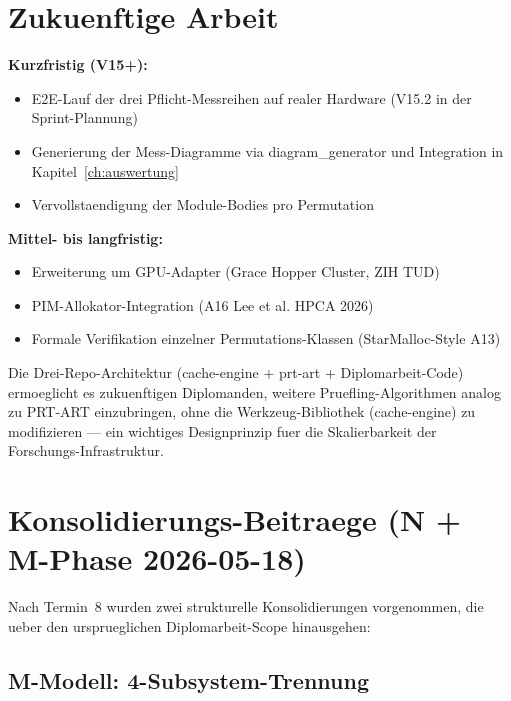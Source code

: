 \section{Zukuenftige Arbeit}\label{sec:ausblick}

\textbf{Kurzfristig (V15+):}

\begin{itemize}
    \item E2E-Lauf der drei Pflicht-Messreihen auf realer Hardware
          (V15.2 in der Sprint-Plannung)
    \item Generierung der Mess-Diagramme via diagram\_generator und
          Integration in Kapitel~\ref{ch:auswertung}
    \item Vervollstaendigung der Module-Bodies pro Permutation
\end{itemize}

\textbf{Mittel- bis langfristig:}

\begin{itemize}
    \item Erweiterung um GPU-Adapter (Grace Hopper Cluster, ZIH TUD)
    \item PIM-Allokator-Integration (A16 Lee et al. HPCA 2026)
    \item Formale Verifikation einzelner Permutations-Klassen
          (StarMalloc-Style A13)
\end{itemize}

Die Drei-Repo-Architektur (cache-engine + prt-art + Diplomarbeit-Code)
ermoeglicht es zukuenftigen Diplomanden, weitere Pruefling-Algorithmen
analog zu PRT-ART einzubringen, ohne die Werkzeug-Bibliothek
(cache-engine) zu modifizieren --- ein wichtiges Designprinzip fuer
die Skalierbarkeit der Forschungs-Infrastruktur.

\section{Konsolidierungs-Beitraege (N + M-Phase 2026-05-18)}\label{sec:konsolidierungs-beitraege}


Nach Termin~8 wurden zwei strukturelle Konsolidierungen vorgenommen,
die ueber den ursprueglichen Diplomarbeit-Scope hinausgehen:

\subsection{M-Modell: 4-Subsystem-Trennung}

